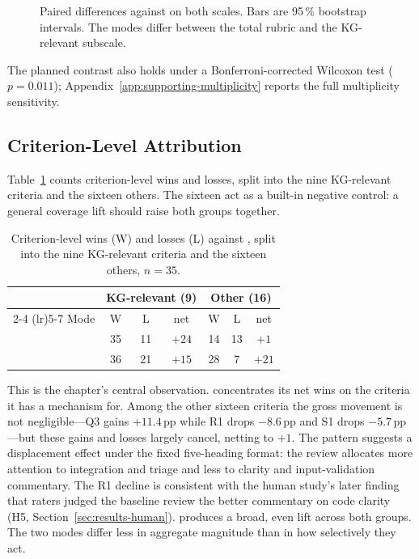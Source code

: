 \begin{figure}[htbp]
    \centering
    
    \caption{Paired differences against \baseline{} on both scales. Bars are
             95\,\% bootstrap intervals. The modes differ between the total
             rubric and the KG-relevant subscale.}
    \label{fig:exp1-effects}
\end{figure}

The planned contrast also holds under a Bonferroni-corrected Wilcoxon test
($p = 0.011$); Appendix~\ref{app:supporting-multiplicity} reports the full
multiplicity sensitivity.

\subsection{Criterion-Level Attribution}
\label{sec:results-exp1-attribution}

Table~\ref{tab:exp1-attribution} counts criterion-level wins and losses,
split into the nine KG-relevant criteria and the sixteen others. The sixteen
act as a built-in negative control: a general coverage lift should raise both
groups together.

\begin{table}[htbp]
    \centering
    \caption{Criterion-level wins (W) and losses (L) against \baseline{},
             split into the nine KG-relevant criteria and the sixteen others,
             $n = 35$.}
    \label{tab:exp1-attribution}
    \small
    \begin{tabular}{lcccccc}
        \toprule
        & \multicolumn{3}{c}{KG-relevant (9)} & \multicolumn{3}{c}{Other (16)} \\
        \cmidrule(lr){2-4} \cmidrule(lr){5-7}
        Mode & W & L & net & W & L & net \\
        \midrule
        \kg{}  & 35 & 11 & $+24$ & 14 & 13 & $+1$ \\
        \rag{} & 36 & 21 & $+15$ & 28 & 7 & $+21$ \\
        \bottomrule
    \end{tabular}
\end{table}

This is the chapter's central observation. \kg{} concentrates its net wins
on the criteria it has a mechanism for. Among the other sixteen criteria the
gross movement is not negligible---Q3 gains $+11.4$\,pp while R1 drops $-8.6$\,pp and S1
drops $-5.7$\,pp---but these gains and losses largely cancel, netting to
$+1$. The pattern suggests a displacement effect under the fixed
five-heading format: the review allocates more attention to integration and
triage and less to clarity and input-validation commentary.
The R1 decline is consistent with the human study's later finding that
raters judged the baseline review the better commentary on code clarity
(H5, Section~\ref{sec:results-human}).
\rag{} produces a broad, even lift across both groups. The two modes differ
less in aggregate magnitude than in how selectively they act.

